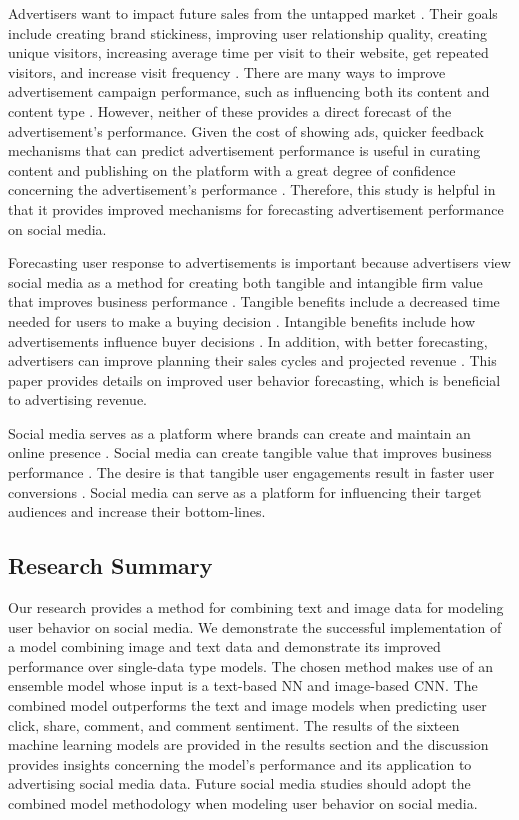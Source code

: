 \documentclass[mksc,blindrev]{informs3} %
\begin{document}
Advertisers want to impact future sales from the untapped market \cite{Guo2020}. Their goals include creating brand stickiness, improving user relationship quality, creating unique visitors, increasing average time per visit to their website, get repeated visitors, and increase visit frequency \cite{Bhat2002}. There are many ways to improve advertisement campaign performance, such as influencing both its content and content type \cite{Imsa2020}. However, neither of these provides a direct forecast of the advertisement's performance. Given the cost of showing ads, quicker feedback mechanisms that can predict advertisement performance is useful in curating content and publishing on the platform with a great degree of confidence concerning the advertisement's performance \cite{Hu2016}. Therefore, this study is helpful in that it provides improved mechanisms for forecasting advertisement performance on social media.

Forecasting user response to advertisements is important because advertisers view social media as a method for creating both tangible and intangible firm value that improves business performance \cite{Authors2013}. Tangible benefits include a decreased time needed for users to make a buying decision \cite{Authors2013}. Intangible benefits include how advertisements influence buyer decisions \cite{Authors2013}. In addition, with better forecasting, advertisers can improve planning their sales cycles and projected revenue \cite{Imsa2020}. This paper provides details on improved user behavior forecasting, which is beneficial to advertising revenue. 

Social media serves as a platform where brands can create and maintain an online presence \cite{Greenwood2016}. Social media can create tangible value that improves business performance \cite{Authors2013}. The desire is that tangible user engagements result in faster user conversions \cite{Authors2013}. Social media can serve as a platform for influencing their target audiences and increase their bottom-lines.

\subsection{Research Summary}

Our research provides a method for combining text and image data for modeling user behavior on social media. We demonstrate the successful implementation of a model combining image and text data and demonstrate its improved performance over single-data type models. The chosen method makes use of an ensemble model whose input is a text-based NN and image-based CNN. The combined model outperforms the text and image models when predicting user click, share, comment, and comment sentiment. The results of the sixteen machine learning models are provided in the results section and the discussion provides insights concerning the model's performance and its application to advertising social media data. Future social media studies should adopt the combined model methodology when modeling user behavior on social media.
\end{document}
